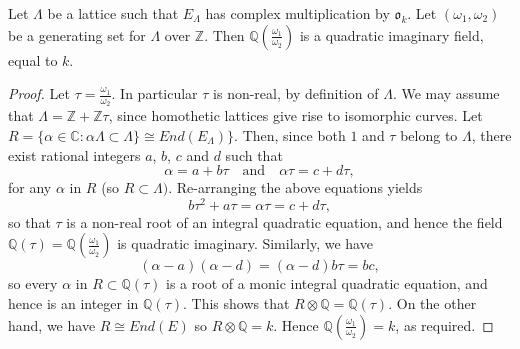 \begin{lem}
  \label{lem:Q-adjoin-w1-over-w2-is-quadratic-imaginary}
  Let $\Lambda$ be a lattice such that $E_{\Lambda}$ has complex multiplication by
  $\mathfrak{o}_{k}$.  Let $(\omega_{1},\omega_{2})$ be a generating set for
  $\Lambda$ over $\mathbb{Z}$.  Then $\mathbb{Q}(\frac{\omega_{1}}{\omega_{2}})$ is a
  quadratic imaginary field, equal to $k$.
\end{lem}
\begin{proof}
  Let $\tau = \frac{\omega_{1}}{\omega_{2}}$.  In particular $\tau$ is non-real, by
  definition of $\Lambda$.  We may assume that $\Lambda = \mathbb{Z} +
  \mathbb{Z}\tau$, since homothetic lattices give rise to isomorphic curves.  Let $R
  = \{\alpha \in \mathbb{C} : \alpha \Lambda \subset \Lambda \} \cong
  End(E_{\Lambda}) \}$.  Then, since both $1$ and $\tau$ belong to $\Lambda$, there
  exist rational integers $a$, $b$, $c$ and $d$ such that
  \begin{equation*}
    \alpha = a + b\tau \quad \text{and} \quad \alpha \tau = c + d \tau,
  \end{equation*}
  for any $\alpha$ in $R$ (so $R \subset \Lambda)$.  Re-arranging the above equations
  yields
  \begin{equation*}
    b\tau^{2} + a\tau = \alpha\tau = c + d\tau,
  \end{equation*}
  so that $\tau$ is a non-real root of an integral quadratic equation, and hence the
  field $\mathbb{Q}(\tau) = \mathbb{Q}(\frac{\omega_{1}}{\omega_{2}})$ is quadratic
  imaginary.  Similarly, we have
  \begin{equation*}
    (\alpha - a)(\alpha - d) = (\alpha - d)b\tau = bc,
  \end{equation*}
  so every $\alpha$ in $R \subset \mathbb{Q}(\tau)$ is a root of a monic integral
  quadratic equation, and hence is an integer in $\mathbb{Q}(\tau)$.  This shows that
  $R \otimes \mathbb{Q} = \mathbb{Q}(\tau)$.  On the other hand, we have $R \cong
  End(E)$ so $R \otimes \mathbb{Q} = k$.  Hence
  $\mathbb{Q}(\frac{\omega_{1}}{\omega_{2}}) = k$, as required.
\end{proof}

